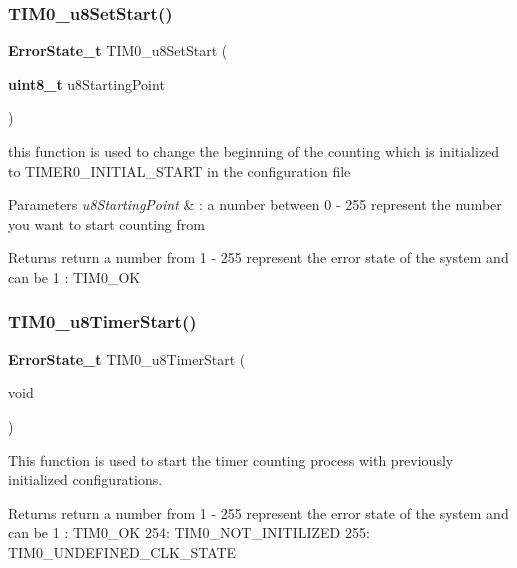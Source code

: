 \subsubsection{T\+I\+M0\+\_\+u8\+Set\+Start()}
{\footnotesize\ttfamily \textbf{ Error\+State\+\_\+t} T\+I\+M0\+\_\+u8\+Set\+Start (\begin{DoxyParamCaption}\item[{\textbf{ uint8\+\_\+t}}]{u8\+Starting\+Point }\end{DoxyParamCaption})}



this function is used to change the beginning of the counting which is initialized to T\+I\+M\+E\+R0\+\_\+\+I\+N\+I\+T\+I\+A\+L\+\_\+\+S\+T\+A\+RT in the configuration file 


\begin{DoxyParams}{Parameters}
{\em u8\+Starting\+Point} & \+: a number between 0 -\/ 255 represent the number you want to start counting from \\
\hline
\end{DoxyParams}
\begin{DoxyReturn}{Returns}
return a number from 1 -\/ 255 represent the error state of the system and can be 1 \+: T\+I\+M0\+\_\+\+OK 
\end{DoxyReturn}
\mbox{\label{_t_i_m_e_r0__interface_8h_af55bbe4c18d1c81a9ac0e9d0c1829e86}} 
\subsubsection{T\+I\+M0\+\_\+u8\+Timer\+Start()}
{\footnotesize\ttfamily \textbf{ Error\+State\+\_\+t} T\+I\+M0\+\_\+u8\+Timer\+Start (\begin{DoxyParamCaption}\item[{void}]{ }\end{DoxyParamCaption})}



This function is used to start the timer counting process with previously initialized configurations. 

\begin{DoxyReturn}{Returns}
return a number from 1 -\/ 255 represent the error state of the system and can be 1 \+: T\+I\+M0\+\_\+\+OK 254\+: T\+I\+M0\+\_\+\+N\+O\+T\+\_\+\+I\+N\+I\+T\+I\+L\+I\+Z\+ED 255\+: T\+I\+M0\+\_\+\+U\+N\+D\+E\+F\+I\+N\+E\+D\+\_\+\+C\+L\+K\+\_\+\+S\+T\+A\+TE 
\end{DoxyReturn}
\mbox{\label{_t_i_m_e_r0__interface_8h_a879b492bece4a913fb4a0d0b0e96dcd1}} 
